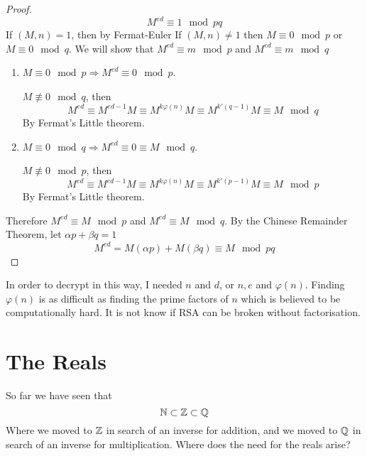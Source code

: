 \documentclass{article}
\begin{document}
\begin{proof}
    \[
        M^{ed} \equiv 1 \mod pq  
    \]
    If $(M,n) = 1$, then by Fermat-Euler
    If $(M, n) \neq 1$ then $M \equiv 0 \mod p$ or $M \equiv 0 \mod q$.
    We will show that $M^{ed} \equiv m \mod p$ and $M^{ed} \equiv m \mod q$
    \begin{enumerate}[cases]
        \item $M \equiv 0 \mod p \Rightarrow M^{ed} \equiv 0 \mod p$.
        
        $M \not \equiv 0 \mod q$, then
        \[
            M^{ed} \equiv M^{ed - 1}M \equiv M^{k \varphi(n)} M \equiv M^{k' (q-1)} M \equiv M \mod q
        \]
        By Fermat's Little theorem.

        \item $M \equiv 0 \mod q \Rightarrow M^{ed} \equiv 0 \equiv M \mod q$.
        
        $M \not \equiv 0 \mod p$, then
        \[
            M^{ed} \equiv M^{ed - 1}M \equiv M^{k \varphi(n)} M \equiv M^{k' (p-1)} M \equiv M \mod p
        \]
        By Fermat's Little theorem.
    \end{enumerate}

    Therefore $M^{ed} \equiv M \mod p$ and $M^{ed} \equiv M \mod q$.
    By the Chinese Remainder Theorem, let $\alpha p + \beta q = 1$
    \[
        M^{ed} = M(\alpha p) + M(\beta q) \equiv M \mod pq
    \]
\end{proof}

\begin{remark}
    In order to decrypt in this way, I needed $n$ and $d$, or $n, e$ and $\varphi(n)$.
    Finding $\varphi(n)$ is as difficult as finding the prime factors of $n$ which is believed to be computationally hard.
    It is not know if RSA can be broken without factorisation.
\end{remark}


\section{The Reals}
So far we have seen that
\[
    \mathbb{N} \subset \mathbb{Z} \subset \mathbb{Q}
\]
Where we moved to $\mathbb{Z}$ in search of an inverse for addition, and we moved to $\mathbb{Q}$ in search of an inverse for multiplication.
Where does the need for the reals arise?
\end{document}

